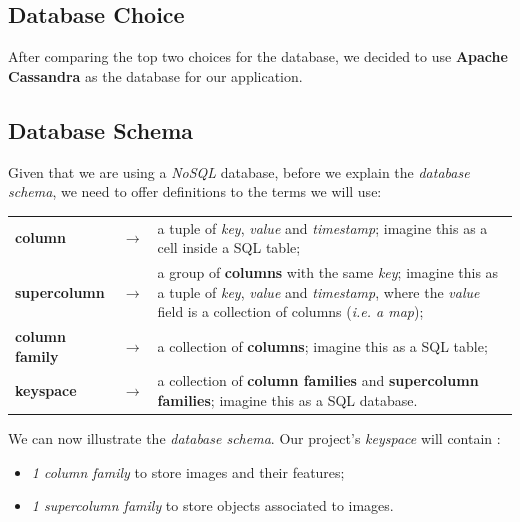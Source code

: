 \documentclass[a4paper,onecolumn,oneside,titlepage,11pt]{report}
\begin{document}
	\subsection{Database Choice}	
	After comparing the top two choices for the database, we decided to use \textbf{Apache Cassandra} \cite{cass} as the database for our application.
	
	\subsection{Database Schema}
	Given that we are using a \emph{NoSQL} database, before we explain the \emph{database schema}, we need to offer definitions to the terms we will use:
	\begin{center}
	\begin{tabularx}{\linewidth}{lcX}
		\textbf{column} & $\rightarrow$ & a tuple of \emph{key}, \emph{value} and \emph{timestamp}; imagine this as a cell inside a SQL table;\\
		\textbf{supercolumn} & $\rightarrow$ & a group of \textbf{columns} with the same \emph{key}; imagine this as a tuple of \emph{key}, \emph{value} and \emph{timestamp}, where the \emph{value} field is a collection of columns (\emph{i.e. a map});\\
		\textbf{column family} & $\rightarrow$ & a collection of \textbf{columns}; imagine this as a SQL table;\\
		\textbf{keyspace} & $\rightarrow$ & a collection of \textbf{column families} and \textbf{supercolumn families}; imagine this as a SQL database.\\
	\end{tabularx}
	\end{center}
	We can now illustrate the \emph{database schema}. Our project's \emph{keyspace} will contain :
	\begin{itemize}
		\item \emph{1 column family} to store images and their features;
		\item \emph{1 supercolumn family} to store objects associated to images.
	\end{itemize}
\end{document}

